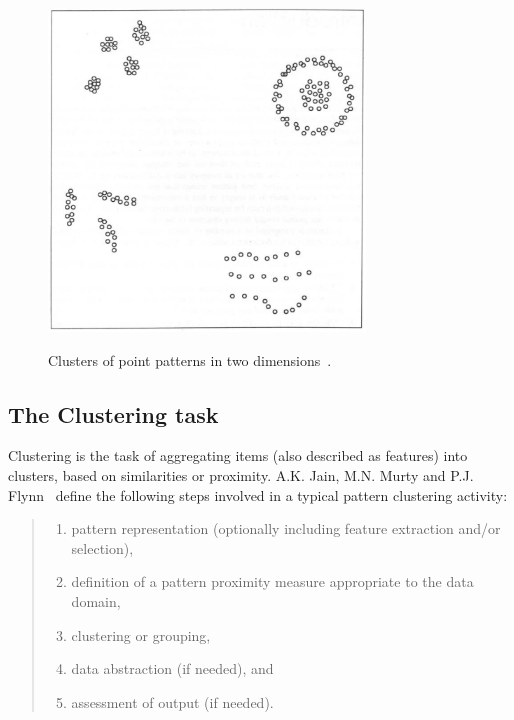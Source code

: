\begin{figure}[h]
  \begin{center}
    \includegraphics[width=0.75\textwidth]{figures/clusters.png}
    \label{fig:clusters}
    \caption{Clusters of point patterns in two dimensions~\cite[p 2]{Jain99clusterreview}.}
  \end{center}
\end{figure}

\subsection{The Clustering task}

Clustering is the task of aggregating items (also described as features) into clusters, based on similarities or proximity. A.K. Jain, M.N. Murty and P.J. Flynn~\cite{Jain99clusterreview} define the following steps involved in a typical pattern clustering activity:
 
\begin{quote}
\begin{enumerate}
\item pattern representation (optionally including feature extraction and/or selection), 
\item definition of a pattern proximity measure appropriate to the data domain, 
\item clustering or grouping, 
\item data abstraction (if needed), and 
\item assessment of output (if needed). 
\end{enumerate}
\end{quote}

